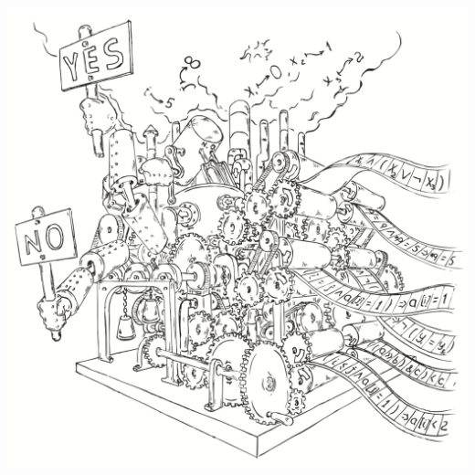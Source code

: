 \documentclass{beamer}
\begin{document}
\begin{frame}
\end{frame}

\begin{frame}
\includegraphics[scale=0.5]{../decision-procedure.png}
\end{frame}
\end{document}
